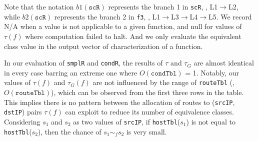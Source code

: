 
Note that the notation $b1(\texttt{scR})$ represents the branch 1 in \texttt{scR}, \ie, L1$\to$L2, while $b2(\texttt{scR})$ represents the branch 2 in \texttt{f3}, \ie, L1$\to$L3$\to$L4$\to$L5. We record N/A when a value is not applicable to a given function, and null for values of $\tau(f)$ where computation failed to halt. And we only evaluate the equivalent class value in the output vector of characterization of a function.


In our evaluation of \texttt{smplR} and \texttt{condR}, the results of $\tau$ and $\tau_G$ are almost identical in every case barring an extreme one where $O(\texttt{condTbl})$ = 1. Notably, our values of $\tau(f)$ and $\tau_G(f)$ are not influenced by the range of \texttt{routeTbl} (\ie, $O(\texttt{routeTbl})$), which can be observed from the first three rows in the table. This implies there is no pattern between the allocation of routes to (\texttt{srcIP}, \texttt{dstIP}) pairs $\tau(f)$ can exploit to reduce its number of equivalence classes. Considering $s_1$ and $s_2$ as two values of \texttt{srcIP}, if \texttt{hostTbl}($s_1$) is not equal to \texttt{hostTbl}($s_2$), then the chance of $s_1 \sim_f s_2$ is very small.



